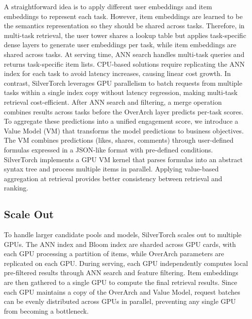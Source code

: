A straightforward idea is to apply different user embeddings and item embeddings to represent each task. However, item embeddings are learned to be the semantics representation so they should be shared across tasks. Therefore, in multi-task retrieval, the user tower shares a lookup table but applies task-specific dense layers to generate user embeddings per task, while item embeddings are shared across tasks.
At serving time, ANN search handles multi-task queries and returns task-specific item lists. CPU-based solutions require replicating the ANN index for each task to avoid latency increases, causing linear cost growth. In contrast, SilverTorch leverages GPU parallelism to batch requests from multiple tasks within a single index copy without latency regression, making multi-task retrieval cost-efficient.
After ANN search and filtering, a merge operation combines results across tasks before the OverArch layer predicts per-task scores. To aggregate these predictions into a unified engagement score, we introduce a Value Model (VM) that transforms the model predictions to business objectives. The VM combines predictions (likes, shares, comments) through user-defined formulas expressed in a JSON-like format with pre-defined conditions. SilverTorch implements a GPU VM kernel that parses formulas into an abstract syntax tree and process multiple items in parallel. Applying value-based aggregation at retrieval provides better consistency between retrieval and ranking.

\subsection{Scale Out}
To handle larger candidate pools and models, SilverTorch scales out to multiple GPUs. The ANN index and Bloom index are sharded across GPU cards, with each GPU processing a partition of items, while OverArch parameters are replicated on each GPU. During serving, each GPU independently computes local pre-filtered results through ANN search and feature filtering. Item embeddings are then gathered to a single GPU to compute the final retrieval results. Since each GPU maintains a copy of the OverArch and Value Model, request batches can be evenly distributed across GPUs in parallel, preventing any single GPU from becoming a bottleneck.

